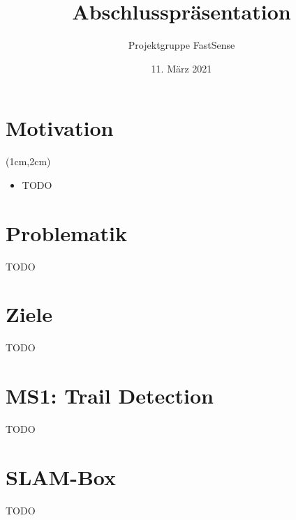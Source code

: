 \documentclass{beamer}
\title{Abschlusspräsentation}
\author{Projektgruppe FastSense}
\date{11. März 2021}
\begin{document}
{
\begin{frame}
\titlepage
\end{frame}}

\section{Motivation}
\begin{frame}{\secname}
\begin{textblock*}{12cm}(1cm,2cm)
\begin{itemize}
\item{TODO}
\end{itemize}
\end{textblock*}
\end{frame}

\section{Problematik}
\begin{frame}{\secname}
TODO
\end{frame}

\section{Ziele}
\begin{frame}{\secname}
TODO
\end{frame}

\section{MS1: Trail Detection}
\begin{frame}{\secname}
TODO    
\end{frame}

\section{SLAM-Box}
\begin{frame}{\secname}
TODO
\end{frame}
\end{document}

